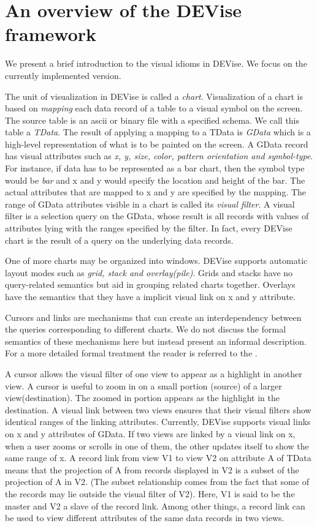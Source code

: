 \section{An overview of the DEVise framework}
\label{sec:devise}

We present a brief introduction to the visual idioms in DEVise. We focus
on the currently implemented version.

The unit of visualization in DEVise is called a {\it chart}. Visualization 
of a chart is based on {\it mapping} each data record of a table
to a visual symbol on the screen. The source table is an ascii
or binary file with a specified schema. We call this table a {\it TData}.  The
result of applying a mapping to a TData is {\it GData} which is a high-level
representation of what is to be painted on the screen. A GData record has
visual attributes such as {\it x, y, size, color, pattern orientation and symbol-type}. For instance, if data has to be represented as a bar chart, then 
the symbol type would be {\it bar} and x and y would specify the location and
height of the bar. The actual attributes that are mapped to x and y are
specified by the mapping. The range of GData attributes visible in a chart
is called its {\it visual filter}. A visual filter is a selection query on 
the GData, whose result is all records with values of attributes lying with
the ranges specified by the filter. In fact, every DEVise chart is 
the result of a query on the underlying data records. 

One of more charts may be organized into windows. DEVise supports automatic
layout modes such as {\it grid, stack and overlay(pile)}. Grids and stacks 
have no query-related semantics but aid in grouping related charts together. 
Overlays have the  semantics that they have a implicit visual link on x and y 
attribute. 

Cursors and links are mechanisms that can create an interdependency 
between the queries corresponding to different charts. We do not discuss
the formal semantics of these mechanisms here but instead present an 
informal description. For a more detailed formal treatment the reader is
referred to the \cite{ref:sigmod}.

A cursor allows the visual filter of one view to appear as a highlight in
another view. A cursor is useful to zoom in on a small portion (source) of a
larger view(destination). The zoomed in portion appears as the highlight
in the destination. A visual link between two views ensures that their visual 
filters show identical ranges of the linking attributes. Currently, DEVise 
supports visual links on x and y attributes of GData. If two views are linked
by a visual link on x, when a user zooms or scrolls in one of them, the other
updates itself to show the same range of x. A record link from view V1 to view
V2 on attribute A of TData means that the projection of A from records
displayed in V2 is a subset of the projection of A in V2. 
(The subset relationship comes from the fact that some of the records may lie 
outside the visual filter of V2). Here, V1 is said to be the master and V2 
a slave of the record link. Among other things, a record link can be used to
view different attributes of the same data records in two views. 

